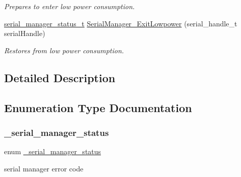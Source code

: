 \begin{DoxyCompactItemize}
\begin{DoxyCompactList}\small\item\em Prepares to enter low power consumption. \end{DoxyCompactList}\item 
\mbox{\hyperlink{group__serialmanager_gac1d9f848c57ca245ad9da8d049369da9}{serial\+\_\+manager\+\_\+status\+\_\+t}} \mbox{\hyperlink{group__serialmanager_gaef5c404d43871f6d8f761b27dbf183fa}{Serial\+Manager\+\_\+\+Exit\+Lowpower}} (serial\+\_\+handle\+\_\+t serial\+Handle)
\begin{DoxyCompactList}\small\item\em Restores from low power consumption. \end{DoxyCompactList}\end{DoxyCompactItemize}


\subsection{Detailed Description}


\subsection{Enumeration Type Documentation}
\mbox{\label{group__serialmanager_ga936dd06c6718edc81ad0423a2bb04ad8}} 
\subsubsection{\texorpdfstring{\_serial\_manager\_status}{\_serial\_manager\_status}}
{\footnotesize\ttfamily enum \mbox{\hyperlink{group__serialmanager_ga936dd06c6718edc81ad0423a2bb04ad8}{\+\_\+serial\+\_\+manager\+\_\+status}}}



serial manager error code 

